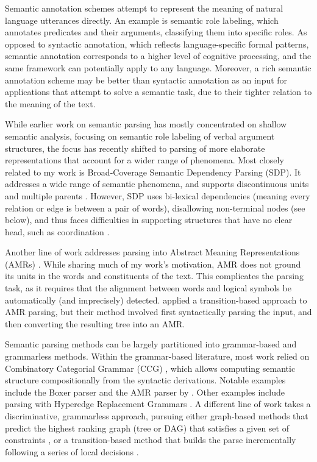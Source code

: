 \documentclass[12pt,a4paper]{report}
\begin{document}
Semantic annotation schemes attempt to represent the meaning of natural
language utterances directly. An example is semantic role
labeling, which annotates
predicates and their arguments, classifying them into specific roles. As
opposed to syntactic annotation, which reflects language-specific formal
patterns, semantic annotation corresponds to a higher level of cognitive
processing, and the same framework can potentially apply to any language.
Moreover, a rich semantic annotation scheme may be better than
syntactic annotation as an input for applications that attempt to solve a
semantic task, due to their tighter relation to the meaning of the text.

While earlier work on semantic parsing has mostly concentrated on shallow semantic analysis,
focusing on semantic role labeling of verbal argument structures,
the focus has recently shifted to parsing of more elaborate representations that account
for a wider range of phenomena. 
Most closely related to my work is Broad-Coverage Semantic Dependency Parsing (SDP).
It addresses a wide range of semantic phenomena,
and supports discontinuous units and multiple parents \cite{oepen2016towards}.
However, SDP uses bi-lexical dependencies
(meaning every relation or edge is between a pair of words),
disallowing non-terminal nodes (see below),
and thus faces difficulties in supporting
structures that have no clear head, such as coordination \cite{Ivanova2012who}.

Another line of work addresses parsing into Abstract Meaning Representations (AMRs)
\cite{banarescu2013abstract,flanigan2014discriminative,vanderwende2015amr,pust2015parsing,artzi2015broad}. 
While sharing much of my work's motivation,
AMR does not ground its units in the words and constituents of the text.
This complicates the parsing task, as it requires
that the alignment between words and logical symbols be automatically
(and imprecisely) detected.
\cite{wang2015transition} applied a transition-based approach to AMR parsing,
but their method involved first syntactically parsing the input, and then converting
the resulting tree into an AMR.

Semantic parsing methods can be largely partitioned into grammar-based and grammarless methods.
Within the grammar-based literature, most work relied on Combinatory Categorial Grammar (CCG)
\cite{Steedman:00}, which allows computing semantic structure compositionally from the
syntactic derivations. Notable examples include the Boxer parser \cite{bos2005towards}
and the AMR parser by \cite{artzi2015broad}.
Other examples include parsing with Hyperedge Replacement Grammars
\cite{jones2012semantics}.
A different line of work takes a discriminative, grammarless approach,
pursuing either graph-based methods that predict the highest ranking graph
(tree or DAG) that satisfies a given set of constraints
\cite[for AMR parsing]{flanigan2014discriminative},
or a transition-based method
that builds the parse incrementally following a series of local
decisions \cite{Nivre03anefficient}.
\end{document}
